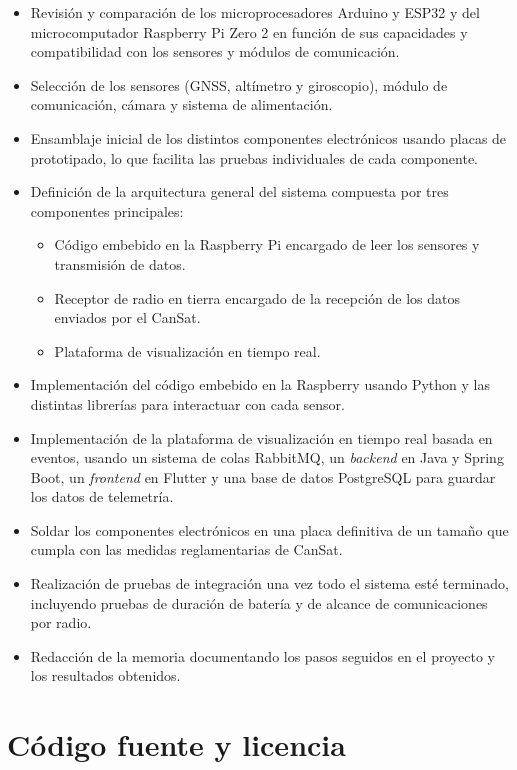\begin{itemize}
    \item Revisión y comparación de los microprocesadores Arduino y ESP32 y del microcomputador Raspberry Pi Zero 2 en función de sus capacidades y compatibilidad con los sensores y módulos de comunicación.
    \item Selección de los sensores (GNSS, altímetro y giroscopio), módulo de comunicación, cámara y sistema de alimentación.
    \item Ensamblaje inicial de los distintos componentes electrónicos usando placas de prototipado, lo que facilita las pruebas individuales de cada componente.
    \item Definición de la arquitectura general del sistema compuesta por tres componentes principales:
    \begin{itemize}
        \item Código embebido en la Raspberry Pi encargado de leer los sensores y transmisión de datos.
        \item Receptor de radio en tierra encargado de la recepción de los datos enviados por el CanSat.
        \item Plataforma de visualización en tiempo real.
    \end{itemize}
    \item Implementación del código embebido en la Raspberry usando Python y las distintas librerías para interactuar con cada sensor.
    \item Implementación de la plataforma de visualización en tiempo real basada en eventos, usando un sistema de colas RabbitMQ, un \emph{backend} en Java y Spring Boot, un \emph{frontend} en Flutter y una base de datos PostgreSQL para guardar los datos de telemetría.
    \item Soldar los componentes electrónicos en una placa definitiva de un tamaño que cumpla con las medidas reglamentarias de CanSat.
    \item Realización de pruebas de integración una vez todo el sistema esté terminado, incluyendo pruebas de duración de batería y de alcance de comunicaciones por radio.
    \item Redacción de la memoria documentando los pasos seguidos en el proyecto y los resultados obtenidos.
\end{itemize}


\section{Código fuente y licencia}

